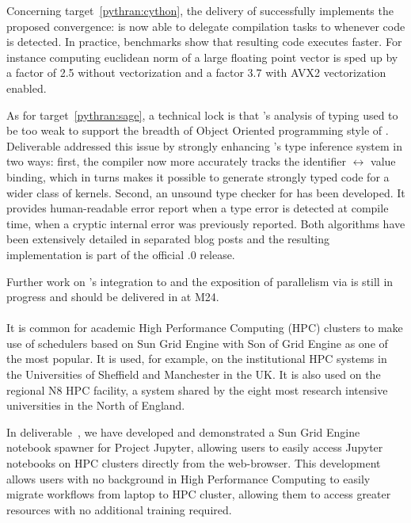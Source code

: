 \documentclass{deliverablereport}
\begin{document}
Concerning target~\ref{pythran:cython}, the delivery of  successfully implements the
proposed convergence: \Cython is now able to delegate compilation tasks to
\Pythran whenever \Numpy code is detected. In practice, benchmarks show that
resulting code executes faster. For instance computing euclidean norm of a large
floating point vector is sped up by a factor of 2.5 without vectorization and
a factor 3.7 with AVX2 vectorization enabled.

As for target~\ref{pythran:sage}, a technical lock is that \Pythran's analysis
of \Python typing used to be too weak to support the breadth of Object Oriented
programming style of \Sage. Deliverable 
addressed this issue by strongly enhancing \Pythran's type inference system in two ways: first, the compiler now more accurately tracks the identifier
$\leftrightarrow$ value binding, which in turns makes it possible to generate strongly
typed code for a wider class of \Python kernels.  Second, an unsound type checker for
\Pythran has been developed. It provides human-readable error report when a type error is
detected at compile time, when a cryptic internal error was previously reported. Both
algorithms have been extensively detailed in separated blog posts and the resulting
implementation is part of the official .0 release.

Further work on \Pythran's integration to \Sage and the exposition of
parallelism via  is still in progress and should be delivered in
 at M24.

  \paragraph{}
  
It is common for academic High Performance Computing (HPC) clusters to make
use of schedulers based on Sun Grid Engine with Son of Grid Engine as one of
the most popular. It is used, for example, on the institutional HPC systems
in the Universities of Sheffield and Manchester in the UK. It is also used
on the regional N8 HPC facility, a system shared by the eight most research
intensive universities in the North of England.

In deliverable~, we have developed and demonstrated a Sun Grid Engine
notebook spawner for Project Jupyter, allowing users to easily access
Jupyter notebooks on HPC clusters directly from the web-browser. This
development allows users with no background in High Performance Computing to
easily migrate workflows from laptop to HPC cluster, allowing them to access
greater resources with no additional training required.
  
\end{document}
